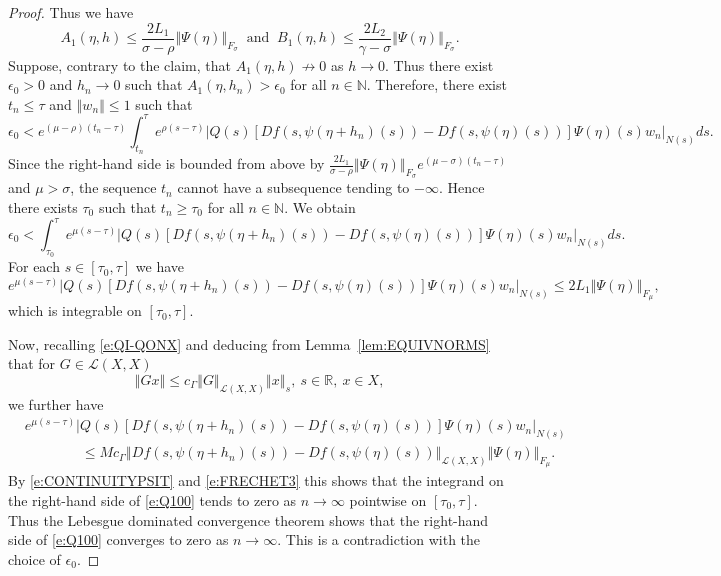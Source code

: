 \documentclass[a4paper,11pt,reqno]{amsart}
\theoremstyle{plain}
\theoremstyle{definition}
\numberwithin{equation}{section}
\newcommand{\N}{\mathbb{N}}
\newcommand{\R}{\mathbb{R}}
\newcommand{\norm}[1]{\left\Vert#1\right\Vert}
\renewcommand{\geq}{\geqslant}
\renewcommand{\leq}{\leqslant}
\begin{document}
\begin{proof}
Thus we have
$$A_1(\eta,h)\leq\frac{2L_1}{\sigma-\rho}\norm{\Psi(\eta)}_{F_\sigma}\ \text{ and }\ B_1(\eta,h)\leq\frac{2L_2}{\gamma-\sigma}\norm{\Psi(\eta)}_{F_\sigma}.$$
Suppose, contrary to the claim, that $A_1(\eta,h)\not\to 0$ as $h\to 0$. Thus there exist $\epsilon_0>0$ and $h_n\to 0$ such that $A_1(\eta,h_n)>\epsilon_0$ for all $n\in\N$. Therefore, there exist $t_n\leq\tau$ and $\norm{w_n}\leq 1$ such that 
$$\epsilon_0<e^{(\mu-\rho)(t_n-\tau)}\int_{t_n}^{\tau}e^{\rho(s-\tau)}|Q(s)[Df(s,\psi(\eta+h_n)(s))-Df(s,\psi(\eta)(s))]\Psi(\eta)(s)w_n|_{N(s)}ds.$$
Since the right-hand side is bounded from above by $\frac{2L_1}{\sigma-\rho}\norm{\Psi(\eta)}_{F_\sigma}e^{(\mu-\sigma)(t_n-\tau)}$ and $\mu>\sigma$,
the sequence $t_n$ cannot have a subsequence tending to $-\infty$. Hence there exists $\tau_0$ such that $t_n\geq\tau_0$ for all $n\in\N$.
We obtain
\begin{equation}\label{e:Q100}
\epsilon_0<\int_{\tau_0}^{\tau}e^{\mu(s-\tau)}|Q(s)[Df(s,\psi(\eta+h_n)(s))-Df(s,\psi(\eta)(s))]\Psi(\eta)(s)w_n|_{N(s)}ds.
\end{equation}
For each  $s\in[\tau_0,\tau]$ we have 
$$e^{\mu(s-\tau)}|Q(s)[Df(s,\psi(\eta+h_n)(s))-Df(s,\psi(\eta)(s))]\Psi(\eta)(s)w_n|_{N(s)}\leq 2L_1\norm{\Psi(\eta)}_{F_\mu},$$
which is integrable on $[\tau_0,\tau]$.

Now, recalling \eqref{e:QI-QONX} 
and deducing from Lemma~\ref{lem:EQUIVNORMS} that for $G\in\mathcal{L}(X,X)$
$$\norm{Gx}\leq c_\Gamma\norm{G}_{\mathcal{L}(X,X)}\norm{x}_{s},\ s\in\R,\ x\in X,$$
we further have
\begin{align*}
&e^{\mu(s-\tau)}|Q(s)[Df(s,\psi(\eta+h_n)(s))-Df(s,\psi(\eta)(s))]\Psi(\eta)(s)w_n|_{N(s)}\\
	&\qquad \qquad  \leq Mc_\Gamma\norm{Df(s,\psi(\eta+h_n)(s))-Df(s,\psi(\eta)(s))}_{\mathcal{L}(X,X)}\norm{\Psi(\eta)}_{F_\mu}.
\end{align*}
By \eqref{e:CONTINUITYPSIT} and \eqref{e:FRECHET3} this shows that the integrand on the right-hand side of \eqref{e:Q100} tends to zero as $n\to\infty$ pointwise on $[\tau_0,\tau]$. 
Thus the Lebesgue dominated convergence theorem shows that the right-hand side of \eqref{e:Q100} converges to zero as $n\to\infty$. This is a contradiction with the choice of $\epsilon_0$.


\end{proof}
\end{document}
